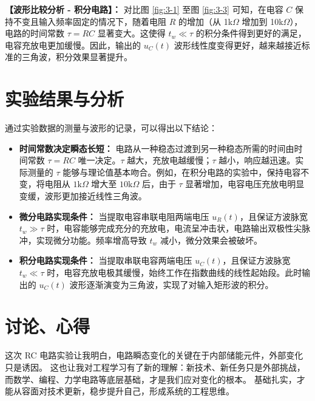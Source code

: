 \documentclass[10.5pt]{config}
\begin{document}
\vspace{1em}
\noindent \textbf{【波形比较分析 - 积分电路】：} 
对比图 \ref{fig:3-1} 至图 \ref{fig:3-3} 可知，在电容 $C$ 保持不变且输入频率固定的情况下，随着电阻 $R$ 的增加（从 1k$\Omega$ 增加到 10k$\Omega$），电路的时间常数 $\tau = RC$ 显著变大。这使得 $t_w \ll \tau$ 的积分条件得到更好的满足，电容充放电更加缓慢。因此，输出的 $u_C(t)$ 波形线性度变得更好，越来越接近标准的三角波，积分效果显著提升。


\section{实验结果与分析}

通过实验数据的测量与波形的记录，可以得出以下结论：
\begin{itemize}[leftmargin=2em]
    \item \textbf{时间常数决定瞬态长短：} 电路从一种稳态过渡到另一种稳态所需的时间由时间常数 $\tau = RC$ 唯一决定。$\tau$ 越大，充放电越缓慢；$\tau$ 越小，响应越迅速。实际测量的 $\tau$ 能够与理论值基本吻合。例如，在积分电路的实验中，保持电容不变，将电阻从 $1\mathrm{k}\Omega$ 增大至 $10\mathrm{k}\Omega$ 后，由于 $\tau$ 显著增加，电容电压充放电明显变缓，波形更加接近线性三角波。
    \item \textbf{微分电路实现条件：} 当提取电容串联电阻两端电压 $u_R(t)$，且保证方波脉宽 $t_w \gg \tau$ 时，电容能够完成充分的充放电，电流呈冲击状，电路输出双极性尖脉冲，实现微分功能。频率增高导致 $t_w$ 减小，微分效果会被破坏。
    \item \textbf{积分电路实现条件：} 当提取串联电容两端电压 $u_C(t)$，且保证方波脉宽 $t_w \ll \tau$ 时，电容充放电极其缓慢，始终工作在指数曲线的线性起始段。此时输出的 $u_C(t)$ 波形逐渐演变为三角波，实现了对输入矩形波的积分。
\end{itemize}


\section{讨论、心得}
这次 RC 电路实验让我明白，电路瞬态变化的关键在于内部储能元件，外部变化只是诱因。
这也让我对工程学习有了新的理解：新技术、新任务只是外部挑战，而数学、编程、力学电路等底层基础，才是我们应对变化的根本。
基础扎实，才能从容面对技术更新，稳步提升自己，形成系统的工程思维。
\end{document}
